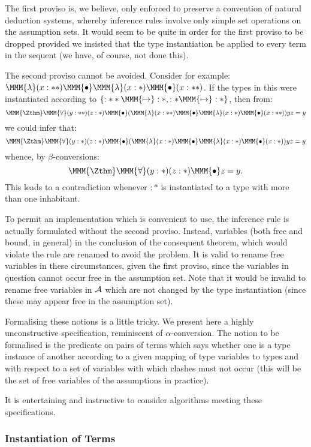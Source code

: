 \documentclass[a4paper,11pt,titlepage]{article}
\begin{document}
\begin{titlepage}
The first proviso is, we believe, only enforced to preserve
a convention of natural deduction systems,
whereby inference rules
involve only simple set operations on the assumption
sets. It would seem to be quite in order for the first
proviso to be dropped provided we insisted that the
type instantiation be applied to every term in the sequent
(we have, of course, not done this).

The second proviso cannot be avoided. Consider for
example: $\MMM{\lambda}(x:**)\MMM{\bullet}\MMM{\lambda}(x:*)\MMM{\bullet}(x:**)$. If the types in this were
instantiated according to $\{:** \MMM{\mapsto} :*, :* \MMM{\mapsto} :*\}$,
then from:
$$\MMM{\Zthm} \MMM{\forall}(y:**)(z:*)\MMM{\bullet}(\MMM{\lambda}(x:**)\MMM{\bullet}\MMM{\lambda}(x:*)\MMM{\bullet}(x:**))y z = y$$
we could infer that:
$$\MMM{\Zthm} \MMM{\forall}(y:*)(z:*)\MMM{\bullet}(\MMM{\lambda}(x:*)\MMM{\bullet}\MMM{\lambda}(x:*)\MMM{\bullet}(x:*))y z = y$$
whence, by $\beta$-conversions:
$$\MMM{\Zthm} \MMM{\forall}(y:*)(z:*)\MMM{\bullet}z = y.$$
This leads to a contradiction whenever $:*$ is instantiated
to a type with more than one inhabitant.

To permit an implementation which is convenient to use,
the inference rule is actually formulated without the
second proviso. Instead, variables (both free and bound,
in general) in the conclusion of the consequent theorem,
which would violate the rule are renamed to
avoid the problem. It is valid to rename free variables
in these circumstances, given the first proviso, since
the variables in question cannot occur free in the
assumption set. Note that it would be invalid to
rename free variables in $\cal A$
which are not changed by the type instantiation
(since these may appear free in the assumption set).

Formalising these notions is a little tricky. We present
here a highly unconstructive specification, reminiscent
of $\alpha$-conversion.
The notion to be formalised is the predicate on
pairs of terms which says whether one is a type instance
of another according to a given mapping of type
variables to types and with respect to a set of
variables with which clashes must not occur (this
will be the set of free variables of the assumptions
in practice).

It is entertaining and instructive to consider
algorithms meeting these specifications.

\subsubsection{Instantiation of Terms}


\end{titlepage}
\end{document}
